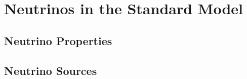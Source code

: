\setchapterpreamble[u]{\margintoc}
\chapter{Neutrinos in the Standard Model}


\section{Neutrino Properties}


\section{Neutrino Sources}
